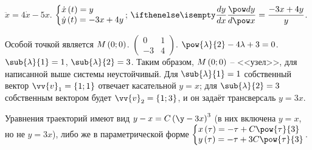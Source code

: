 \documentclass[a5paper,10pt]{article}
\begin{document}
$\ddot{x} = 4\dot{x} - 5x$.
$\tsys{\dot{x}\br{t} = y \\ \dot{y}\br{t} = -3x + 4y}$;
$\der{y}{x} = \dfrac {-3x + 4y} {y}$.

Особой точкой является $M\left(\hspace{0.01em}0; 0\hspace{0.01em}\right)$.
$\begin{pmatrix} 0 & 1 \\ -3 & 4 \end{pmatrix}$.
$\pow{\lambda}{2} -4\lambda + 3 = 0$.
$\sub{\lambda}{1} = 1$, $\sub{\lambda}{2} = 3$.
Таким образом, $M\left(\hspace{0.01em}0; 0\hspace{0.01em}\right)$ -- <<узел>>, для написанной выше системы неустойчивый.
Для $\sub{\lambda}{1} = 1$ собственный вектор $\vv{v}_{1} = \cbr{1; 1}$
отвечает касательной $y = x$;
для $\sub{\lambda}{2} = 3$ собственным вектором будет
$\vv{v}_{2} = \cbr{1; 3}$, и он задаёт трансверсаль $y = 3x$.

Уравнения траекторий имеют вид $y - x = C\br{\y - 3x}^3$
(в них включена $y = x$, но не $y = 3x$),
либо же в параметрической форме
$\tsys{
    x\br{\tau} = -\tau + C \pow{\tau}{3} \\
    y\br{\tau} = -\tau + 3C \pow{\tau}{3}
}$.
\end{document}
